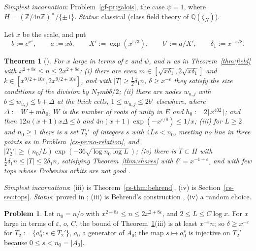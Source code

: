 \documentclass[reqno]{amsart}
\theoremstyle{definition}
\newtheorem{problem}{Problem}[section]
\theoremstyle{plain}
\newtheorem{theorem}{Theorem}[section]
\newcommand{\Z}{\mathbb{Z}}
\newcommand{\Q}{\mathbb{Q}}
\begin{document}
\noindent\emph{Simplest incarnation}: Problem~\ref{gf-pr:galois}, the case \(\psi = 1\), where \(H = (\Z/4n\Z)^\times/\{\pm1\}\).  \emph{Status}: classical (class field theory of \(\Q(\zeta_N)\)).

Let \(x\) be the scale, and put
\[
  b := e^{x^\varepsilon}, \qquad a := xb, \qquad X' := \exp(x^{\varepsilon/3}), \qquad b' := a/X', \qquad \delta_1 := x^{-\varepsilon/8} .
\]

\begin{theorem}[{\cite[Props.~5.15--5.17, 5.20 and~18.7, Cor.~18.8]{Adr}}]\label{thm:sizes}
For \(x\) large in terms of \(\varepsilon\) and \(\psi\), and \(n\) as in Theorem~\ref{thm:field} with \(x^{2+8\varepsilon} \le n \le 2x^{2+8\varepsilon}\):
(i) there are even \(m \in [\sqrt{x\delta_1}, 2\sqrt{x\delta_1}]\) and \(k \in [x^{9/2+10\varepsilon}, 2x^{9/2+10\varepsilon}]\), and with \(\lvert T\rvert \ge \frac12\delta_1n\), \(\delta \ge x^{-\varepsilon}\) they satisfy the size conditions \cite[(4.6), (4.7)]{Adr} of the division by \(N_Tmb\delta/2\);
(ii) there are nodes \(w_{u,j}\) with \(b \le w_{u,j} \le b + \Delta\) at the thick cells, \(1 \le w_{u,j} \le 2b'\) elsewhere, where \(\Delta := W + mh_0\), \(W\) is the number of roots of unity in \(E\) and \(h_0 := 2\lceil x^{402}\rceil\); and then \(12n(x+1)x\Delta \le b\) and \(4n(x+1)\exp(-x^{\varepsilon/8}) \le 1/x\);
(iii) for \(L \ge 2\) and \(n_0 \ge 1\) there is a set \(T_2'\) of integers \(s\) with \(4Ls < n_0\), meeting no line in three points as in Problem~\ref{cs-pr:no-relation}, and \(\lvert T_2'\rvert \ge (n_0/L)\exp(-36\sqrt{\log n_0\log L})\);
(iv) there is \(T \subset H\) with \(\frac12\delta_1 n \le \lvert T\rvert \le 2\delta_1 n\), satisfying Theorem~\ref{thm:shares} with \(\delta' = x^{-1+\varepsilon}\), and with few tops whose Frobenius orbits are not good \cite[Def.~5.19]{Adr}.
\end{theorem}

\noindent\emph{Simplest incarnations}: (iii) is Theorem~\ref{cs-thm:behrend}, (iv) is Section~\ref{cs-sec:tops}.  \emph{Status}: proved in \cite{Adr}; (iii) is Behrend's construction \cite{Beh}, (iv) a random choice.

\begin{problem}\label{pr:behrend}
Let \(n_0 = n/o\) with \(x^{2+8\varepsilon} \le n \le 2x^{2+8\varepsilon}\), and \(2 \le L \le C\log x\).  For \(x\) large in terms of \(\varepsilon\), \(o\), \(C\), the bound of Theorem~\ref{thm:sizes}(iii) is at least \(x^{-\varepsilon}n\); so \(\delta \ge x^{-\varepsilon}\) for \(T_2 := \{a_0^s : s \in T_2'\}\), \(a_0\) a generator of \(A_0\); the map \(s \mapsto a_0^s\) is injective on \(T_2'\) because \(0 \le s < n_0 = \lvert A_0\rvert\).
\end{problem}
\end{document}
